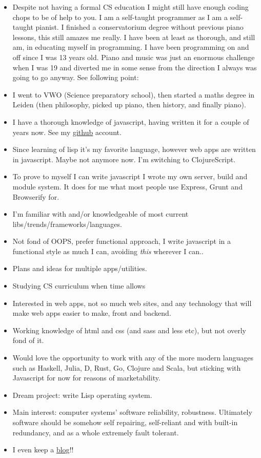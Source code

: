 \documentclass[11pt,a4paper,sans]{moderncv}        %
\begin{document}
\begin{itemize} \itemsep1pt \parskip5pt 
\item Despite not having a formal CS education I might still have enough coding
  chops to be of help to you. I am a self-taught programmer as I am a
  self-taught pianist. I finished a conservatorium degree without previous piano
  lessons, this still amazes me really. I have been at least as thorough, and
  still am, in educating myself in programming. I have been programming on and
  off since I was 13 years old. Piano and music was just an enormous challenge
  when I was 19 and diverted me in some sense from the direction I always was
  going to go anyway. See following point:
\item I went to VWO (Science preparatory school), then started a maths degree in
  Leiden (then philosophy, picked up piano, then history, and finally piano).
\item I have a thorough knowledge of javascript, having written it for a couple of
  years now. See my \href{http://github.com/michieljoris}{github} account.
\item Since learning of lisp it's my favorite language, however web apps are written
  in javascript. Maybe not anymore now. I'm switching to ClojureScript.
\item To prove to myself I can write javascript I wrote my own server, build and
  module system. It does for me what most people use Express, Grunt and
  Browserify for.
\item I'm familiar with and/or knowledgeable of most current
  libs/trends/frameworks/languages.
\item Not fond of OOPS, prefer functional approach, I write javascript in a
  functional style as much I can, avoiding \emph{this} wherever I can..
\item Plans and ideas for multiple apps/utilities.
\item Studying CS curriculum when time allows
\item Interested in web apps, not so much web sites, and any technology that will
  make web apps easier to make, front and backend.
\item Working knowledge of html and css (and sass and less etc), but not overly fond of it.
\item Would love the opportunity to work with any of the more modern languages such
  as Haskell, Julia, D, Rust, Go, Clojure and Scala, but sticking with
  Javascript for now for reasons of marketability.
\item Dream project: write Lisp operating system.
\item Main interest: computer systems' software reliability, robustness. Ultimately
  software should be somehow self repairing, self-reliant and with built-in
  redundancy, and as a whole extremely fault tolerant.
\item I even keep a \href{http://www.axion5.net}{blog}!!
\end{itemize}
  
\end{document}
